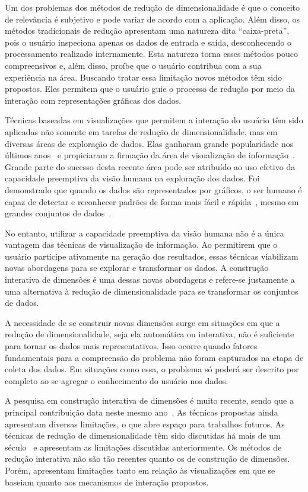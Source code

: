 Um dos problemas dos métodos de redução de dimensionalidade
é que o conceito de relevância é subjetivo e pode variar de
acordo com a aplicação. Além disso, os métodos tradicionais
de redução apresentam uma natureza dita ``caixa-preta'',
pois o usuário inspeciona apenas os dados de entrada e
saída, desconhecendo o processamento realizado internamente.
Esta natureza torna esses métodos pouco compreensivos e,
além disso, proíbe que o usuário contribua com a sua
experiência na área. Buscando tratar essa limitação novos
métodos têm sido propostos. Eles permitem que o usuário
guie o processo de redução por meio da interação com
representações gráficas dos dados.

Técnicas baseadas em visualizações que permitem a
interação do usuário têm sido aplicadas não somente em
tarefas de redução de dimensionalidade, mas em diversas
áreas de exploração de dados. Elas ganharam grande
popularidade nos últimos anos~\cite{State2012} e propiciaram
a firmação da área de visualização de
informação~\cite{Keim2002}. Grande parte do sucesso desta
recente área pode ser atribuído ao uso efetivo da capacidade
preemptiva da visão humana na exploração dos dados. Foi
demonstrado que quando os dados são representados por 
gráficos, o ser humano é capaz de detectar e reconhecer
padrões de forma mais fácil e rápida~\cite{Healey1995},
mesmo em grandes conjuntos de dados~\cite{Fodor2002}. 

No entanto, utilizar a capacidade preemptiva da visão humana
não é a única vantagem das técnicas de visualização de
informação. Ao permitirem que o usuário participe ativamente
na geração dos resultados, essas técnicas viabilizam novas
abordagens para se explorar e transformar os dados. A
construção interativa de dimensões é uma dessas novas
abordagens e refere-se justamente a uma alternativa à
redução de dimensionalidade para se transformar os conjuntos
de dados.

A necessidade de se construir novas dimensões surge em
situações em que a redução de dimensionalidade, seja ela
automática ou interativa, não é suficiente para tornar os
dados mais representativos.  Isso ocorre quando fatores
fundamentais para a compreensão do problema não foram
capturados na etapa de coleta dos dados. Em situações como
essa, o problema só poderá ser descrito por completo ao se
agregar o conhecimento do usuário nos dados.

A pesquisa em construção interativa de dimensões é muito
recente, sendo que a principal contribuição data neste mesmo
ano~\cite{Gladys2013}. As técnicas propostas ainda
apresentam diversas limitações, o que abre espaço para
trabalhos futuros. As técnicas de redução de
dimensionalidade têm sido discutidas há mais de um
século~\cite{Pearson1901} e apresentam as limitações
discutidas anteriormente. Os métodos de redução interativa
não são tão recentes quanto os de construção de dimensões.
Porém, apresentam limitações tanto em relação às
visualizações em que se baseiam quanto aos mecanismos de
interação propostos.

